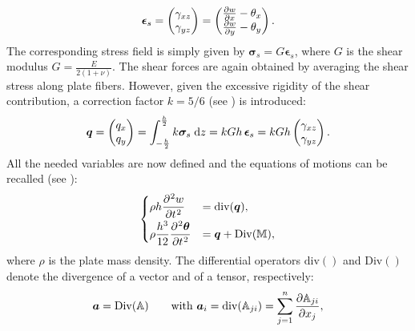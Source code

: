 \documentclass[11pt]{article}
\begin{document}
{		\begin{equation}	
		\bm{\epsilon}_s = 
		\begin{pmatrix}
		\gamma_{xz} \\
		\gamma_{yz} \\
		\end{pmatrix} = 
		\begin{pmatrix}
		\diffp{w}{x} - \theta_x \\
		\diffp{w}{y} - \theta_y \\
		\end{pmatrix}.
		\end{equation}
		The corresponding stress field is simply given by $\bm\sigma_s = G \bm{\epsilon}_s$, where $G$ is the shear modulus $G = \frac{E}{2 (1 + \nu)}$. The shear forces are again obtained by averaging the shear stress along plate fibers. However, given the excessive rigidity of the shear contribution, a correction factor $k = 5/6$ (see \cite{mindlin}) is introduced:
		\begin{equation}
		\bm{q} = \begin{pmatrix}
		q_x \\
		q_y \\
		\end{pmatrix} =
		\int_{-\frac{h}{2} }^{ \frac{h}{2} } k \bm\sigma_s \d{z} = k G h \, \bm{\epsilon}_s = k G h
		\begin{pmatrix}
		\gamma_{xz} \\
		\gamma_{yz} \\
		\end{pmatrix}.
		\end{equation}
		All the needed variables are now defined and the equations of motions can be recalled (see \cite{mindlin}): 
		\begin{equation}
		\begin{cases}
		\displaystyle \rho h \diffp[2]{w}{t} &= \mathrm{div}(\bm{q}),  \vspace{1mm}\\
		\displaystyle \rho\frac{h^3}{12} \diffp[2]{\bm \theta}{t} &= \bm{q} + \mathrm{Div}(\mathbb{M}), \\
		\end{cases}
		\end{equation}
		where $\rho$ is the plate mass density. The differential operators $\mathrm{div}()$ and $\mathrm{Div}()$ denote the divergence of a vector and of a tensor, respectively:
		\begin{equation*}
		\bm{a} = \mathrm{Div}(\mathbb{A})  \qquad \text{with } \bm{a}_i = \mathrm{div}(\mathbb{A}_{ji}) = \sum_{j = 1}^n \diffp{\mathbb{A}_{ji}}{x_j},

\end{equation*}}
\end{document}
